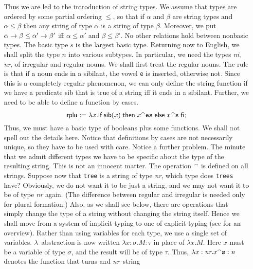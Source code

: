 Thus we are led to the introduction of string types. We assume that
types are ordered by some partial ordering $\leq$, so that if
$\alpha$ and $\beta$ are string types and $\alpha \leq \beta$ then
any string of type $\alpha$ is a string of type $\beta$. Moreover, 
we put $\alpha \rightarrow \beta \leq \alpha' \rightarrow \beta'$ iff 
$\alpha \leq \alpha'$ and $\beta \leq \beta'$. No other relations 
hold between nonbasic types. The basic type $s$ is the largest basic 
type. Returning now to English, we shall split the type $n$ into 
various subtypes. In particular, we need the types {\it ni}, {\it nr}, 
of irregular and regular nouns.  We shall first treat the regular 
nouns. The rule is that if a noun ends in a sibilant, the vowel 
{\tt e} is inserted, otherwise not.  Since this is a completely 
regular phenomenon, we can only define the string function if we 
have a predicate {\sf sib} that is true of a string iff 
it ends in a sibilant. Further, we need to be able to define a 
function by cases. 
\begin{equation}
\mbox{\sf rplu} := \lambda x.\mbox{\sf if}\; \mbox{\sf sib}(x)\; 
	\mbox{\sf then} \; x{^{\smallfrown}}\mbox{\tt es}\; 
	\mbox{\sf else} \; x {^{\smallfrown}} \mbox{\tt s}\; \mbox{\sf fi;}
\end{equation}
Thus, we must have a basic type of booleans plus some functions.
We shall not spell out the details here. Notice that definitions 
by cases are not necessarily unique, so they have to be used with 
care. Notice a further problem. The minute that we admit different 
types we have to be specific about the type of the resulting string. 
This is not an innocent matter. The operation ${^{\smallfrown}}$ is defined 
on all strings. Suppose now that {\tt tree} is a string of type 
{\it nr}, which type does {\tt trees} have? Obviously, we do not 
want it to be just a string, and we may not want it to be of type 
{\it nr\/} again. (The difference between regular and irregular is 
needed only for plural formation.) Also, as we shall see below, there 
are operations that simply change the type of a string without changing
the string itself. Hence we shall move from a system of implicit
typing to one of explicit typing (see \cite{mitchell:type} for an 
overview). Rather than using variables for each type, we use a single 
set of variables. $\lambda$--abstraction is now written 
$\lambda x:\sigma.M : \tau$ in place of $\lambda x.M$. Here $x$  
must be a variable of type $\sigma$, and the result will be of 
type $\tau$. Thus, $\lambda x:\mbox{\it nr}.x \conc \mbox{\tt s} %
: \mbox{\it n}$ denotes the function that turns and {\it nr\/}--string 
